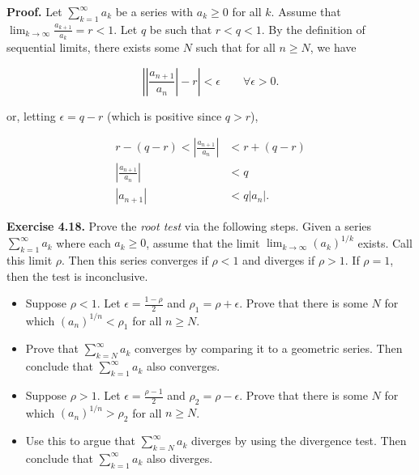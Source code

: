 \documentclass[12pt]{article}
\begin{document}
\noindent\textbf{Proof.} Let \(\sum_{k=1}^{\infty} a_k\) be a series with \(a_k \geq 0\) for all \(k\). Assume that \(\lim_{k \to \infty} \frac{a_{k+1}}{a_k} = r < 1\). Let \(q\) be such that \(r < q < 1\). By the definition of sequential limits, there exists some \(N\) such that for all \(n \geq N\), we have

\begin{equation}
    \left\vert \left\vert\frac{a_{n+1}}{a_n}\right\vert - r \right\vert < \epsilon \qquad \forall \epsilon > 0.
\end{equation}

\noindent or, letting \(\epsilon = q - r\) (which is positive since \(q > r\)),

\begin{align}
    r - (q - r) < \left\vert\frac{a_{n+1}}{a_n}\right\vert &< r + (q - r) \\
    \left\vert\frac{a_{n+1}}{a_n}\right\vert &< q \\
    \left\vert a_{n+1} \right\vert &< q \left\vert a_n \right\vert.\label{eq:ratio-test-1}
\end{align}



\noindent\textbf{Exercise 4.18.} Prove the \textit{root test} via the following steps. Given a series \(\sum_{k=1}^{\infty} a_k\) where each \(a_k \geq 0\), assume that the limit \(\lim_{k \to \infty} (a_k)^{1/k}\) exists. Call this limit \(\rho\). Then this series converges if \(\rho < 1\) and diverges if \(\rho > 1\). If \(\rho = 1\), then the test is inconclusive.

\begin{itemize}
    \item [(a)] Suppose \(\rho < 1\). Let \(\epsilon = \frac{1-\rho}{2}\) and \(\rho_1 = \rho + \epsilon\). Prove that there is some \(N\) for which \((a_n)^{1/n} < \rho_1\) for all \(n \geq N\).
    \item [(b)] Prove that \(\sum_{k=N}^{\infty} a_k\) converges by comparing it to a geometric series. Then conclude that \(\sum_{k=1}^{\infty} a_k\) also converges.
    \item [(c)] Suppose \(\rho > 1\). Let \(\epsilon = \frac{\rho - 1}{2}\) and \(\rho_2 = \rho - \epsilon\). Prove that there is some \(N\) for which \((a_n)^{1/n} > \rho_2\) for all \(n \geq N\).
    \item [(d)] Use this to argue that \(\sum_{k=N}^{\infty} a_k\) diverges by using the divergence test. Then conclude that \(\sum_{k=1}^{\infty} a_k\) also diverges.
\end{itemize}
\end{document}
